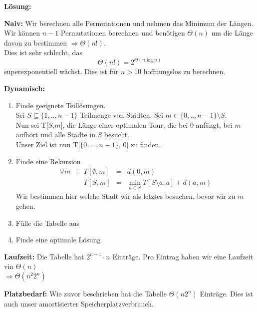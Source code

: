 \textbf{Lösung:}
\begin{description}
\item{\bfseries Naiv:} Wir berechnen alle Permutationen und  nehmen das Minimum der Längen.\\
Wir können $n-1$ Permutationen berechnen und benötigen $\Theta ( n )$ um die Länge davon zu bestimmen $\Rightarrow \Theta ( n! )$.\\
Dies ist sehr schlecht, das
$$
\Theta (n ! ) = 2^{\Theta (n \log n)}
$$
superexponentiell wächst. Dies ist für $n> 10$ hoffnungslos zu berechnen.

\item{\bfseries Dynamisch:}

\begin{enumerate}

\item Finde geeignete Teillösungen.\\

Sei $S \subseteq \{ 1 , .. , n-1 \}$ Teilmenge von Städten.
Sei $m \in \{0, .., n-1\} \setminus S$.\\
Nun sei T[$S$,$m$], die Länge einer optimalen Tour, die bei $0$ anfängt, bei $m$ aufhört und alle Städte in $S$ besucht.\\
Unser Ziel ist nun T[$\{0, ... , n-1\}$, $0$] zu finden.

\item Finde eine Rekursion
$$
\begin{array}{rcrcl}
\forall m &:& T[\emptyset , m] &=& d(0,m)\\
&& T[S,m] &=& \underset{a \in S}{\min} T[S \setminus a, a] + d(a,m)
\end{array}
$$
Wir bestimmen hier welche Stadt wir als letztes besuchen, bevor wir zu $m$ gehen.

\item Fülle die Tabelle aus

\item Finde eine optimale Lösung

\end{enumerate}

\item{\bfseries Laufzeit:} Die Tabelle hat $2^{n-1} \cdot n$ Einträge. Pro Eintrag haben wir eine Laufzeit vin $\Theta (n)$\\
$\Rightarrow \Theta (n^2 2^n)$\\
\item{\bfseries Platzbedarf:} Wie zuvor beschrieben hat die Tabelle $\Theta (n2^n)$ Einträge. Dies ist auch unser amortisierter Speicherplatzverbrauch.
\end{description}

